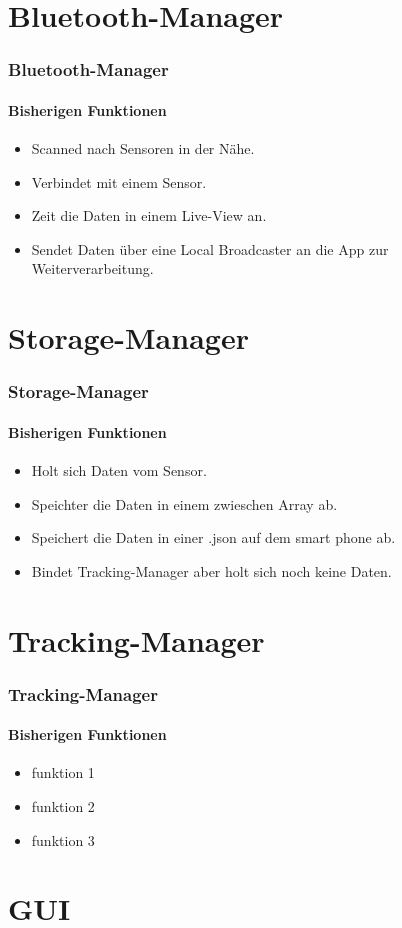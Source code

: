 \documentclass{beamer}
\begin{document}
\section{Bluetooth-Manager}

\begin{frame}
\frametitle{Bluetooth-Manager}
\framesubtitle{Bisherigen Funktionen}
\begin{itemize}
  \item Scanned nach Sensoren in der N\"ahe.
	\item Verbindet mit einem Sensor.
  \item Zeit die Daten in einem Live-View an.
  \item Sendet Daten \"uber eine Local Broadcaster an die App zur Weiterverarbeitung.
\end{itemize}
\end{frame}


\section{Storage-Manager}

\begin{frame}
\frametitle{Storage-Manager}
\framesubtitle{Bisherigen Funktionen}
\begin{itemize}
  \item Holt sich Daten vom Sensor.
	\item Speichter die Daten in einem zwieschen Array ab.
  \item Speichert die Daten in einer .json auf dem smart phone ab.
  \item Bindet Tracking-Manager aber holt sich noch keine Daten.
\end{itemize}
\end{frame}


\section{Tracking-Manager}

\begin{frame}
\frametitle{Tracking-Manager}
\framesubtitle{Bisherigen Funktionen}
\begin{itemize}
  \item funktion 1
	\item funktion 2
  \item funktion 3
\end{itemize}
\end{frame}

\section{GUI}
\end{document}
